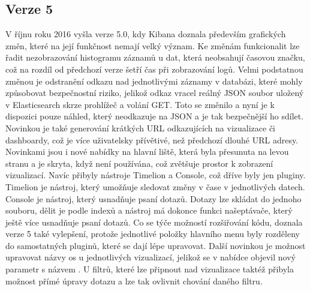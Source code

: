\documentclass[czech,BP]{thesiskiv}
\begin{document}
 \subsection{Verze 5}
 V říjnu roku 2016 vyšla verze 5.0, kdy Kibana doznala především grafických změn, které na její funkčnost nemají velký význam. Ke změnám funkcionalit lze řadit nezobrazování histogramu záznamů u dat, která neobsahují časovou značku, což na rozdíl od předchozí verze šetří čas při zobrazování logů. Velmi podstatnou změnou je odstranění odkazu nad jednotlivými záznamy v databázi, které mohly způsobovat bezpečnostní riziko, jelikož odkaz vracel reálný JSON soubor uložený v Elasticsearch skrze prohlížeč a volání GET. Toto se změnilo a nyní je k dispozici pouze náhled, který neodkazuje na JSON a je tak bezpečnější ho sdílet. Novinkou je také generování krátkých URL odkazujících na vizualizace či dashboardy, což je více uživatelsky přívětivé, než předchozí dlouhé URL adresy. Novinkami jsou i nové nabídky na hlavní liště, která byla přesunuta na levou stranu a je skryta, když není používána, což zvětšuje prostor k zobrazení vizualizací. Navíc přibyly nástroje Timelion a Console, což dříve byly jen pluginy. Timelion je nástroj, který umožňuje sledovat změny v čase v jednotlivých datech. Console je nástroj, který usnadňuje psaní dotazů. Dotazy lze skládat do jednoho souboru, dělit je podle indexů a nástroj má dokonce funkci našeptávače, který ještě více usnadňuje psaní dotazů. Co se týče možností rozšiřování kódu, doznala verze 5 také vylepšení, protože jednotlivé položky hlavního menu byly rozděleny do samostatných pluginů, které se dají lépe upravovat. Další novinkou je možnost upravovat názvy os u jednotlivých vizualizací, jelikož se v nabídce objevil nový parametr s názvem . U filtrů, které lze připnout nad vizualizace taktéž přibyla možnost přímé úpravy dotazu a lze tak ovlivnit chování daného filtru. \cite{Kibana5intro}

\end{document}
